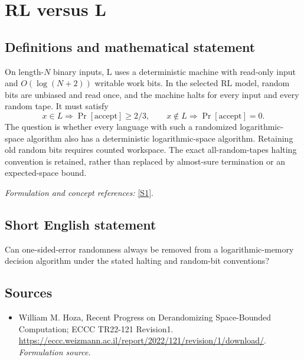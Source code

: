 \documentclass[11pt]{article}
\begin{document}
\section*{\texorpdfstring{RL versus L}{RL versus L}}\label{statement}
\subsection{Definitions and mathematical statement}
On length-$N$ binary inputs, $\mathrm L$ uses a deterministic machine with read-only input and $O(\log(N+2))$ writable work bits. In the selected $\mathrm{RL}$ model, random bits are unbiased and read once, and the machine halts for every input and every random tape. It must satisfy
\[
 x\in L\Rightarrow\Pr[\mathrm{accept}]\ge2/3,
 \qquad x\notin L\Rightarrow\Pr[\mathrm{accept}]=0.
\]
The question is whether every language with such a randomized logarithmic-space algorithm also has a deterministic logarithmic-space algorithm. Retaining old random bits requires counted workspace. The exact all-random-tapes halting convention is retained, rather than replaced by almost-sure termination or an expected-space bound.
\par\smallskip\textit{Formulation and concept references:} \href{https://eccc.weizmann.ac.il/report/2022/121/revision/1/download/}{[S1]}.

\subsection{Short English statement}
Can one-sided-error randomness always be removed from a logarithmic-memory decision algorithm under the stated halting and random-bit conventions?
\subsection{Sources}
\begin{itemize}
\item[S1]William M. Hoza, Recent Progress on Derandomizing Space-Bounded Computation; ECCC TR22-121 Revision1.
\url{https://eccc.weizmann.ac.il/report/2022/121/revision/1/download/}.
\textit{Formulation source.}
\end{itemize}
\end{document}
